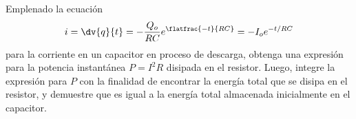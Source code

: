 \begin{mdframed}[style=warning]
	\begin{ejercicio}
		Emplenado la ecuación
			$$ i = \dv{q}{t} = -\frac{Q_o}{RC} e^{\flatfrac{-t}{RC}} = -I_o e^{-t/RC} $$
		para la corriente en un capacitor en proceso de descarga, obtenga una expresión para la potencia instantánea $P = I^2 R$ disipada en el resistor. Luego, integre la expresión para $P$ con la finalidad de encontrar la energía total que se disipa en el resistor, y demuestre que es igual a la energía total almacenada inicialmente en el capacitor.
	\end{ejercicio}
\end{mdframed}






































































